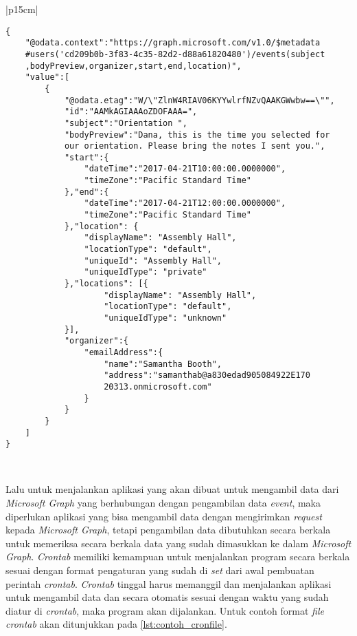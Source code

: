 \documentclass[a4paper,twoside]{article}
\begin{document}
\begin{enumerate}
\begin{table}[H]
	\centering 
	\caption{Tabel contoh \textit{response event}}
	\label{tab:contoh_response_event}
	\begin{tabular}{|p{15cm}|}
	\hline
	\begin{lstlisting}
{
    "@odata.context":"https://graph.microsoft.com/v1.0/$metadata
    #users('cd209b0b-3f83-4c35-82d2-d88a61820480')/events(subject
    ,bodyPreview,organizer,start,end,location)",
    "value":[
        {
            "@odata.etag":"W/\"ZlnW4RIAV06KYYwlrfNZvQAAKGWwbw==\"",
            "id":"AAMkAGIAAAoZDOFAAA=",
            "subject":"Orientation ",
            "bodyPreview":"Dana, this is the time you selected for 
            our orientation. Please bring the notes I sent you.",
            "start":{
                "dateTime":"2017-04-21T10:00:00.0000000",
                "timeZone":"Pacific Standard Time"
            },"end":{
                "dateTime":"2017-04-21T12:00:00.0000000",
                "timeZone":"Pacific Standard Time"
            },"location": {
                "displayName": "Assembly Hall",
                "locationType": "default",
                "uniqueId": "Assembly Hall",
                "uniqueIdType": "private"
            },"locations": [{
                    "displayName": "Assembly Hall",
                    "locationType": "default",
                    "uniqueIdType": "unknown"
            }],                
            "organizer":{
                "emailAddress":{
                    "name":"Samantha Booth",
                    "address":"samanthab@a830edad905084922E170
                    20313.onmicrosoft.com"
                }
            }
        }
    ]
}
\end{lstlisting}\\
	\hline
	\end{tabular}  
\end{table}

Lalu untuk menjalankan aplikasi yang akan dibuat untuk mengambil data dari \textit{Microsoft Graph} yang berhubungan dengan pengambilan data \textit{event}, maka diperlukan aplikasi yang bisa mengambil data dengan mengirimkan \textit{request} kepada \textit{Microsoft Graph}, tetapi pengambilan data dibutuhkan secara berkala untuk memeriksa secara berkala data yang sudah dimasukkan ke dalam \textit{Microsoft Graph}. \textit{Crontab} memiliki kemampuan untuk menjalankan program secara berkala sesuai dengan format pengaturan yang sudah di \textit{set} dari awal pembuatan perintah \textit{crontab}. \textit{Crontab} tinggal harus memanggil dan menjalankan aplikasi untuk mengambil data dan secara otomatis sesuai dengan waktu yang sudah diatur di \textit{crontab}, maka program akan dijalankan. Untuk contoh format \textit{file crontab} akan ditunjukkan pada \ref{lst:contoh_cronfile}.


\end{enumerate}
\end{document}
